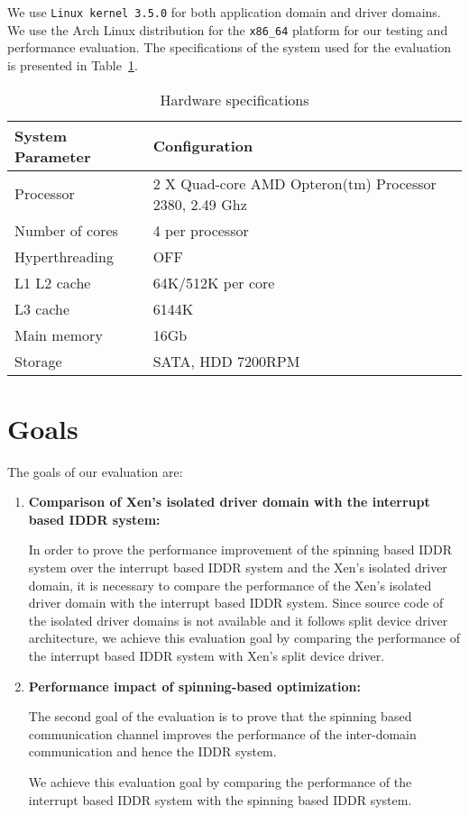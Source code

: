 We use \texttt{Linux kernel 3.5.0} for both application domain and driver domains. We use the Arch Linux distribution for the \texttt{x86\_64} platform for our testing and performance evaluation. The specifications of the system used for the evaluation is presented in Table~\ref{tab:config}. 

\begin{table}
\caption{Hardware specifications}
\begin{center}
\begin{tabular}{ll}
  \hline
  \label{tab:config}
  System Parameter & Configuration \\
  \hline
  Processor & 2 X Quad-core AMD Opteron(tm) Processor 2380, 2.49 Ghz \\
  Number of cores & 4 per processor \\
  Hyperthreading & OFF \\
  L1 L2 cache & 64K/512K per core \\
  L3 cache & 6144K \\
  Main memory & 16Gb \\
  Storage & SATA, HDD 7200RPM \\
  \hline 
\end{tabular}
\end{center}
\end{table}

\section{Goals}
\label{sec:goals}
The goals of our evaluation are:
\begin{enumerate}
\item \textbf{Comparison  of Xen's isolated driver domain with the interrupt based IDDR system:}

In order to prove the performance improvement of the spinning based IDDR system over the interrupt based IDDR system and the Xen's isolated driver domain, it is necessary to compare the performance of the Xen's isolated driver domain with the interrupt based IDDR system. Since source code of the isolated driver domains is not available and it follows split device driver architecture, we achieve this evaluation goal by comparing the performance of the interrupt based IDDR system with Xen's split device driver.

\item \textbf{Performance impact of spinning-based optimization:}

The second goal of the evaluation is to prove that the spinning based communication channel improves the performance of the inter-domain communication and hence the IDDR system.

We achieve this evaluation goal by comparing the performance of the interrupt based IDDR system with the spinning based IDDR system.
\end{enumerate}

